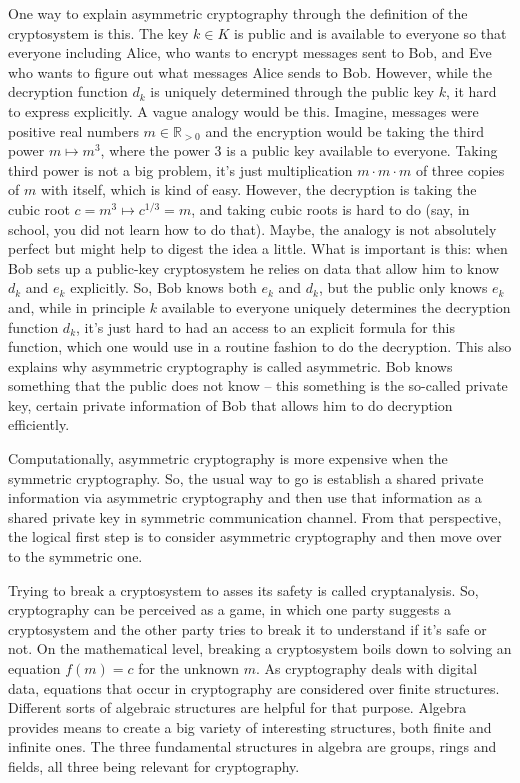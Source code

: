 \documentclass[11pt]{article}
\newcommand{\R}{\mathbb{R}}
\theoremstyle{plain}
\theoremstyle{definition}
\begin{document}
One way to explain asymmetric cryptography through the definition of the cryptosystem is this. The key $k \in K$ is public and is available to everyone so that everyone including Alice, who wants to encrypt messages sent to Bob, and Eve who wants to figure out what messages Alice sends to Bob. However, while the decryption function $d_k$ is uniquely determined through the public key $k$, it hard to express explicitly. A vague analogy would be this. Imagine, messages were positive real numbers $m \in \R_{>0}$ and the encryption would be taking the third power $m \mapsto m^3$, where the power $3$ is a public key available to everyone. Taking third power is not a big problem, it's just multiplication $m \cdot m \cdot m$ of three copies of $m$ with itself, which is kind of easy. However, the decryption is taking the cubic root $c = m^3 \mapsto c^{1/3} = m$, and taking cubic roots is hard to do (say, in school, you did not learn how to do that). Maybe, the analogy is not absolutely perfect but might help to digest the idea a little. What is important is this: when Bob sets up a public-key cryptosystem he relies on data that allow him to know $d_k$ and $e_k$ explicitly. So, Bob knows both $e_k$ and $d_k$, but the public only knows $e_k$ and, while in principle $k$ available to everyone uniquely determines the decryption function $d_k$, it's just hard to had an access to an explicit formula for this function, which one would use in a routine fashion to do the decryption. This also explains why asymmetric cryptography is called asymmetric. Bob knows something that the public does not know -- this something is the so-called private key, certain private information of Bob that allows him to do decryption efficiently. 

Computationally, asymmetric cryptography is more expensive when the symmetric cryptography. So, the usual way to go is establish a shared private information via asymmetric cryptography and then use that information as a shared private key in symmetric communication channel. From that perspective, the logical first step is to consider asymmetric cryptography and then move over to the symmetric one. 

Trying to break a cryptosystem to asses its safety is called cryptanalysis. So, cryptography can be perceived as a game, in which one party suggests a cryptosystem and the other party tries to break it to understand if it's safe or not. On the mathematical level, breaking a cryptosystem boils down to solving an equation $f(m) = c$ for the unknown $m$. As cryptography deals with digital data, equations that occur in cryptography are considered over finite structures. Different sorts of algebraic structures are helpful for that purpose. Algebra provides means to create a big variety of interesting structures, both finite and infinite ones. The three fundamental structures in algebra are groups, rings and fields, all three being relevant for cryptography. 
\end{document}
